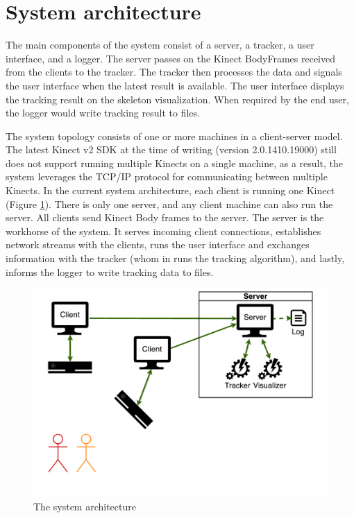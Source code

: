 \section{System architecture}
\label{sec:design_architecture}

The main components of the system consist of a server, a tracker, a user interface, and a logger. The server passes on the Kinect BodyFrames received from the clients to the tracker. The tracker then processes the data and signals the user interface when the latest result is available. The user interface displays the tracking result on the skeleton visualization. When required by the end user, the logger would write tracking result to files.

The system topology consists of one or more machines in a client-server model. The latest Kinect v2 SDK at the time of writing (version 2.0.1410.19000) still does not support running multiple Kinects on a single machine, as a result, the system leverages the TCP/IP protocol for communicating between multiple Kinects. In the current system architecture, each client is running one Kinect (Figure \ref{fig:system_architecture}). There is only one server, and any client machine can also run the server. All clients send Kinect Body frames to the server. The server is the workhorse of the system. It serves incoming client connections, establishes network streams with the clients, runs the user interface and exchanges information with the tracker (whom in runs the tracking algorithm), and lastly, informs the logger to write tracking data to files.

\begin{figure}[!h]
  \centering

  \includegraphics[width=0.8\linewidth]{figs/system_architecture}
  
  \caption{The system architecture}
  
  \label{fig:system_architecture}
\end{figure}


